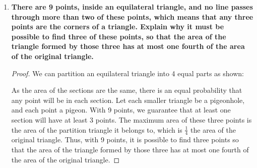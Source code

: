 \documentclass[article, 12pt]{article}
\theoremstyle{definition}
\begin{document}
\begin{enumerate}[(1)]
\begin{proof}
    \end{proof}
    \item \textbf{There are 9 points, inside an equilateral triangle, and no line passes through more than two of these points, which means that any three points are the corners of a triangle. Explain why it must be possible to find three of these points, so that the area of the triangle formed by those three has at most one fourth of the area of the original triangle.}
    \begin{proof}
        We can partition an equilateral triangle into 4 equal parts as shown:
        \begin{figure}[H]
            \centering
        \end{figure}
        As the area of the sections are the same, there is an equal probability that any point will be in each section. Let each smaller triangle be a pigeonhole, and each point a pigeon. With 9 points, we guarantee that at least one section will have at least 3 points. The maximum area of these three points is the area of the partition triangle it belongs to, which is $\frac{1}{4}$ the area of the original triangle. Thus, with 9 points, it is possible to find three points so that the area of the triangle formed by those three has at most one fourth of the area of the original triangle.
    \end{proof}
\end{enumerate}
\end{document}
